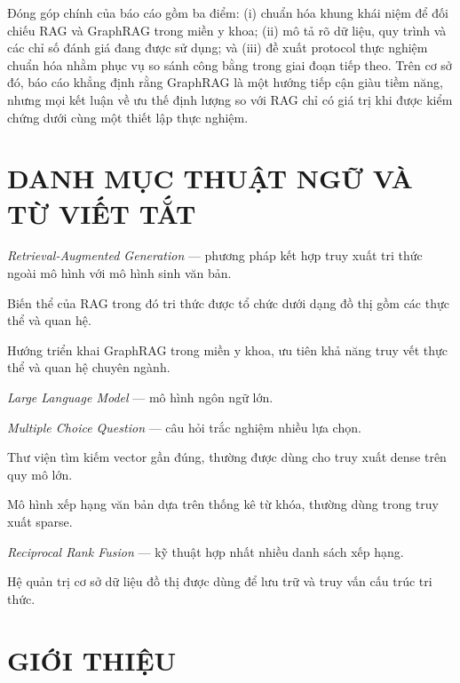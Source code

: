 \documentclass[a4paper,12pt,twoside]{report}
\begin{document}
Đóng góp chính của báo cáo gồm ba điểm: (i) chuẩn hóa khung khái niệm để đối chiếu RAG và GraphRAG trong miền y khoa; (ii) mô tả rõ dữ liệu, quy trình và các chỉ số đánh giá đang được sử dụng; và (iii) đề xuất protocol thực nghiệm chuẩn hóa nhằm phục vụ so sánh công bằng trong giai đoạn tiếp theo. Trên cơ sở đó, báo cáo khẳng định rằng GraphRAG là một hướng tiếp cận giàu tiềm năng, nhưng mọi kết luận về ưu thế định lượng so với RAG chỉ có giá trị khi được kiểm chứng dưới cùng một thiết lập thực nghiệm.
\newpage

\chapter*{DANH MỤC THUẬT NGỮ VÀ TỪ VIẾT TẮT}
\begin{description}[style=nextline,leftmargin=3.4cm,labelwidth=3cm]
  \item[RAG] \textit{Retrieval-Augmented Generation} --- phương pháp kết hợp truy xuất tri thức ngoài mô hình với mô hình sinh văn bản.
  \item[GraphRAG] Biến thể của RAG trong đó tri thức được tổ chức dưới dạng đồ thị gồm các thực thể và quan hệ.
  \item[MedGraphRAG] Hướng triển khai GraphRAG trong miền y khoa, ưu tiên khả năng truy vết thực thể và quan hệ chuyên ngành.
  \item[LLM] \textit{Large Language Model} --- mô hình ngôn ngữ lớn.
  \item[MCQ] \textit{Multiple Choice Question} --- câu hỏi trắc nghiệm nhiều lựa chọn.
  \item[FAISS] Thư viện tìm kiếm vector gần đúng, thường được dùng cho truy xuất dense trên quy mô lớn.
  \item[BM25] Mô hình xếp hạng văn bản dựa trên thống kê từ khóa, thường dùng trong truy xuất sparse.
  \item[RRF] \textit{Reciprocal Rank Fusion} --- kỹ thuật hợp nhất nhiều danh sách xếp hạng.
  \item[Neo4j] Hệ quản trị cơ sở dữ liệu đồ thị được dùng để lưu trữ và truy vấn cấu trúc tri thức.
\end{description}
\newpage


\chapter{GIỚI THIỆU}
\label{chap:intro}
\end{document}
